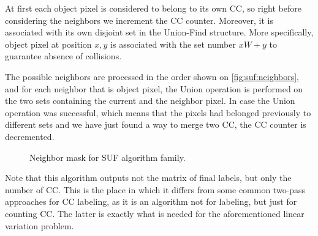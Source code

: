 \documentclass[hidelinks]{llncs}
\newcommand{\texten}[1]{#1}
\newcommand{\textru}[1]{}
\begin{document}
\texten{
At first each object pixel is considered to belong to its own CC, so right before
considering the neighbors we increment the CC counter.
Moreover, it is associated with its own disjoint set in the Union-Find structure.
More specifically, object pixel at position $x, y$ is associated with
the set number $xW + y$ to guarantee absence of collisions.
}\textru{
Каждый объектный пиксель сначала предполагается принадлежащим своей КС.
Поэтому прежде чем начинать рассматривать соседей, мы увеличиваем счётчик.
Более того того, каждый пиксель изначально ассоциирован со своим собственным
независимым множеством в структуре Union-Find, состоящем из одного элемента.
Конкретно пиксель в позиции $x, y$ заранее ассоциирован с элементом номер $xW + y$,
чтобы гарантировать отсутствие коллизий.
}

\texten{
The possible neighbors are processed in the order shown on \autoref{fig:suf:neighbors},
and for each neighbor that is object pixel, the Union operation is performed
on the two sets containing the current and the neighbor pixel.
In case the Union operation was successful, which means that the pixels
had belonged previously to different sets and we have just found a way to merge two
CC, the CC counter is decremented.
}\textru{
Возможные соседи перебираются в порядке, показанном на
\autoref{fig:suf:neighbors}.
Для каждого объектного пикселя, который напрямую соседствует с текущим, мы
применяем операцию Union для множества, содержащих текущий пиксель и
множества, содержащего этого соседа.
Если эти множества не совпадали, то мы нашли место, где КС соединяются.
В этом случае уменьшаем счётчик на 1.
}

\begin{figure}
  \centering
  \caption{Neighbor mask for SUF algorithm family.}
  \label{fig:suf:neighbors}
\end{figure}

\texten{
Note that this algorithm outputs not the matrix of final labels, but only the number
of CC.
This is the place in which it differs from some common two-pass approaches for CC %
labeling, as it is an algorithm not for labeling, but just for counting CC.
The latter is exactly what is needed for the aforementioned linear variation problem.
}\textru{
Отметим, что этот алгоритм выдаёт не матрицу финальных меток, а только
количество компонент связности.
Именно в этом месте он отличается от некоторых известных подходов к CC labeling.
Для текущей задачи нам нужно именно считать компоненты связности.
}
\end{document}
